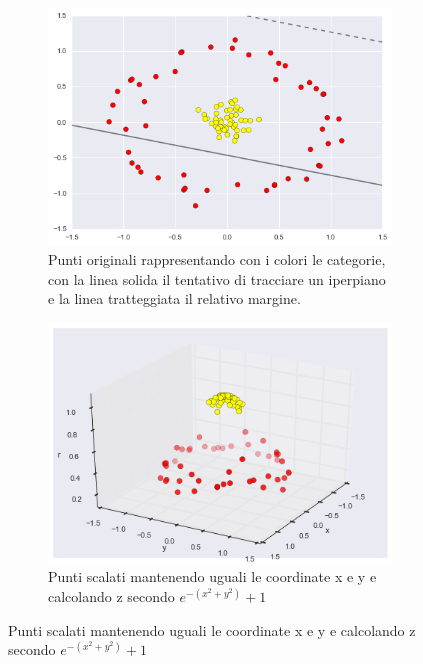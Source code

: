 \documentclass[a4paper,12pt]{report}
\begin{document}
\begin{figure}[!h]
	\caption{Esempio dati scalati con funzione kenrel}
	\begin{subfigure}{0.5\textwidth}
		\includegraphics[width=0.9\linewidth]{Immagini/SVm non lineare.png}
		\captionsetup{width=.8\linewidth }
		\caption{Punti originali rappresentando con i colori le categorie, con
			la linea solida il tentativo di tracciare un iperpiano e la linea
			tratteggiata il relativo margine. \cite{Data science handbook}} 
	\end{subfigure}
	\begin{subfigure}{0.5\textwidth}
		\includegraphics[width=0.9\linewidth]{Immagini/SVM kernel.png}
		\captionsetup{width=.8\linewidth}
		\caption{Punti scalati mantenendo uguali le coordinate x e y e
			calcolando z secondo $e^{-(x^2 + y^2)} + 1$ \cite{Data science handbook}}
	\end{subfigure}

	
\end{figure}
\end{document}
